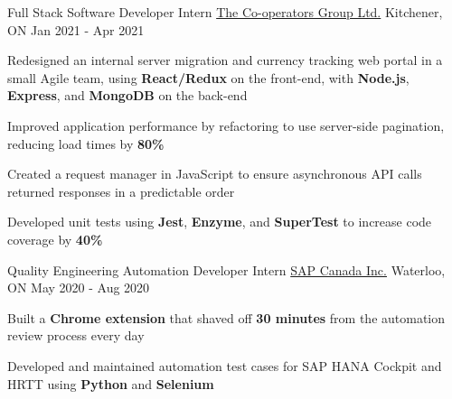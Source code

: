 \begin{cventries}
  \cventry
    {Full Stack Software Developer Intern} %
    {\href{https://www.cooperators.ca/}{The Co-operators Group Ltd.}} %
    {Kitchener, ON} %
    {Jan 2021 - Apr 2021} %
    {
      \begin{cvitems} %
      \item {Redesigned an internal server migration and currency tracking web portal in a small Agile team, using \textbf{React/Redux} on the front-end, with \textbf{Node.js}, \textbf{Express}, and \textbf{MongoDB} on the back-end}
      \item {Improved application performance by refactoring to use server-side pagination, reducing load times by \textbf{80\%}}
      \item {Created a request manager in JavaScript to ensure asynchronous API calls returned responses in a predictable order}
      \item {Developed unit tests using \textbf{Jest}, \textbf{Enzyme}, and \textbf{SuperTest} to increase code coverage by \textbf{40\%}}
      \end{cvitems}
    }
    
  \cventry
    {Quality Engineering Automation Developer Intern} %
    {\href{https://www.sap.com/canada/index.html}{SAP Canada Inc.}} %
    {Waterloo, ON} %
    {May 2020 - Aug 2020} %
    {
      \begin{cvitems} %
      \item {Built a \textbf{Chrome extension} that shaved off \textbf{30 minutes} from the automation review process every day}
      \item {Developed and maintained automation test cases for SAP HANA Cockpit and HRTT using \textbf{Python} and \textbf{Selenium}}
      \end{cvitems}
    }
       
\end{cventries}
